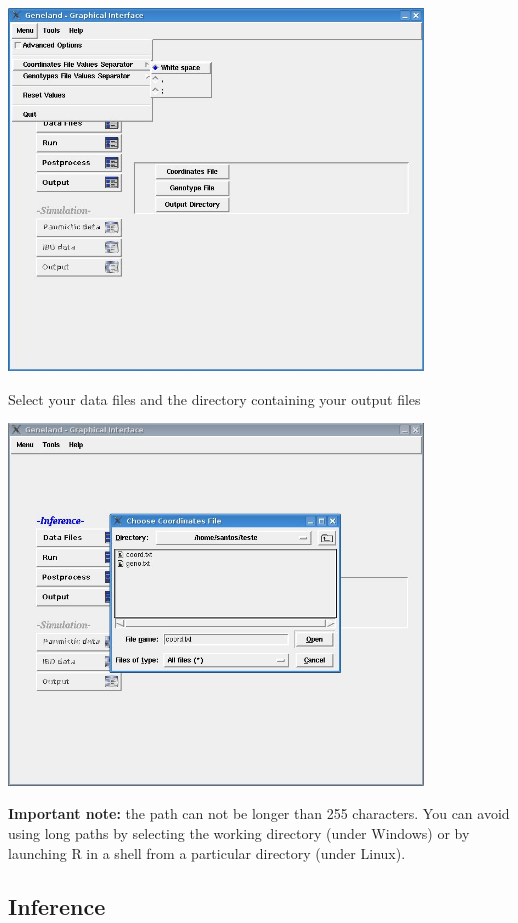 \documentclass[a4paper,10pt]{article}
\begin{document}
\centerline{\includegraphics[width=11cm]{./fig/choosesep.jpg}}

\bigskip

Select  your data files and the directory containing your output files\\

\centerline{\includegraphics[width=11cm]{./fig/choosefiles.jpg}}


{\bf Important note:} the path can not be longer than 255 characters. 
You can avoid using long paths by selecting the working directory (under Windows) or by launching R in a  shell from 
a particular directory (under Linux). 

\subsection{Inference}
\end{document}
